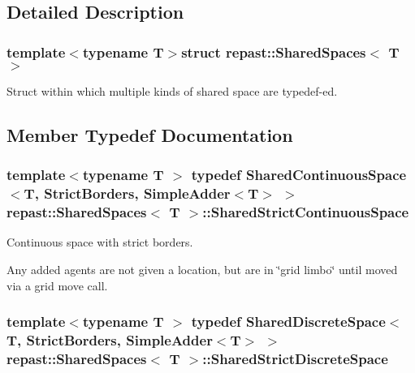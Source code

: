 \subsection{Detailed Description}
\subsubsection*{template$<$typename T$>$struct repast\-::\-Shared\-Spaces$<$ T $>$}

Struct within which multiple kinds of shared space are typedef-\/ed. 

\subsection{Member Typedef Documentation}
\hypertarget{structrepast_1_1_shared_spaces_ada3e584944f724336e2a74d99af6fc55}{
\subsubsection[{Shared\-Strict\-Continuous\-Space}]{\setlength{\rightskip}{0pt plus 5cm}template$<$typename T $>$ typedef {\bf Shared\-Continuous\-Space}$<$T, {\bf Strict\-Borders}, {\bf Simple\-Adder}$<$T$>$ $>$ {\bf repast\-::\-Shared\-Spaces}$<$ T $>$\-::{\bf Shared\-Strict\-Continuous\-Space}}}\label{structrepast_1_1_shared_spaces_ada3e584944f724336e2a74d99af6fc55}


Continuous space with strict borders. 

Any added agents are not given a location, but are in \char`\"{}grid limbo\char`\"{} until moved via a grid move call. \hypertarget{structrepast_1_1_shared_spaces_ad248b97883d6310a57ce5c644eb8aa11}{
\subsubsection[{Shared\-Strict\-Discrete\-Space}]{\setlength{\rightskip}{0pt plus 5cm}template$<$typename T $>$ typedef {\bf Shared\-Discrete\-Space}$<$T, {\bf Strict\-Borders}, {\bf Simple\-Adder}$<$T$>$ $>$ {\bf repast\-::\-Shared\-Spaces}$<$ T $>$\-::{\bf Shared\-Strict\-Discrete\-Space}}}\label{structrepast_1_1_shared_spaces_ad248b97883d6310a57ce5c644eb8aa11}


